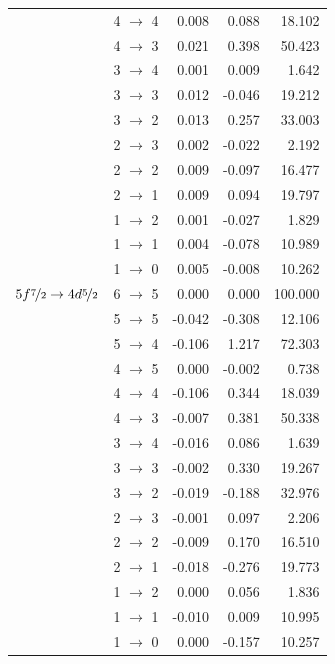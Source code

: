 \begin{table}[b]
\begin{small}
\begin{tabular}{cc|rrr}
 & 4 $\rightarrow$ 4&0.008&0.088&18.102\\
 & 4 $\rightarrow$ 3&0.021&0.398&50.423\\
 & 3 $\rightarrow$ 4&0.001&0.009&1.642\\
 & 3 $\rightarrow$ 3&0.012&-0.046&19.212\\
 & 3 $\rightarrow$ 2&0.013&0.257&33.003\\
 & 2 $\rightarrow$ 3&0.002&-0.022&2.192\\
 & 2 $\rightarrow$ 2&0.009&-0.097&16.477\\
 & 2 $\rightarrow$ 1&0.009&0.094&19.797\\
 & 1 $\rightarrow$ 2&0.001&-0.027&1.829\\
 & 1 $\rightarrow$ 1&0.004&-0.078&10.989\\
 & 1 $\rightarrow$ 0&0.005&-0.008&10.262\\[10pt]
$5f\nicefrac{7}{2} \rightarrow 4d\nicefrac{5}{2}$ & 6 $\rightarrow$ 5&0.000&0.000&100.000\\
 & 5 $\rightarrow$ 5&-0.042&-0.308&12.106\\
 & 5 $\rightarrow$ 4&-0.106&1.217&72.303\\
 & 4 $\rightarrow$ 5&0.000&-0.002&0.738\\
 & 4 $\rightarrow$ 4&-0.106&0.344&18.039\\
 & 4 $\rightarrow$ 3&-0.007&0.381&50.338\\
 & 3 $\rightarrow$ 4&-0.016&0.086&1.639\\
 & 3 $\rightarrow$ 3&-0.002&0.330&19.267\\
 & 3 $\rightarrow$ 2&-0.019&-0.188&32.976\\
 & 2 $\rightarrow$ 3&-0.001&0.097&2.206\\
 & 2 $\rightarrow$ 2&-0.009&0.170&16.510\\
 & 2 $\rightarrow$ 1&-0.018&-0.276&19.773\\
 & 1 $\rightarrow$ 2&0.000&0.056&1.836\\
 & 1 $\rightarrow$ 1&-0.010&0.009&10.995\\
 & 1 $\rightarrow$ 0&0.000&-0.157&10.257\\
\end{tabular}
\end{small}
\end{table}%
%
%
%
